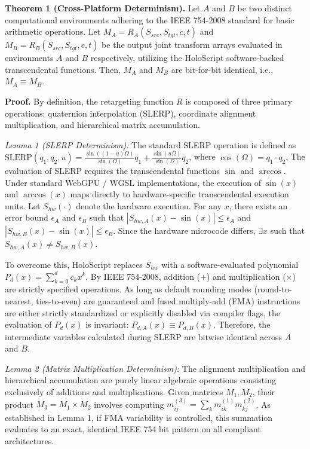 \documentclass[sigconf,nonacm]{acmart}
\begin{document}
\textbf{Theorem 1 (Cross-Platform Determinism).} Let $A$ and $B$ be two distinct
computational environments adhering to the IEEE 754-2008 standard for basic
arithmetic operations. Let $M_A = R_A(S_{src}, S_{tgt}, c, t)$ and $M_B =
R_B(S_{src}, S_{tgt}, c, t)$ be the output joint transform arrays evaluated in
environments $A$ and $B$ respectively, utilizing the HoloScript software-backed
transcendental functions. Then, $M_A$ and $M_B$ are bit-for-bit identical, i.e.,
$M_A \equiv M_B$.

\textbf{Proof.} By definition, the retargeting function $R$ is composed of three
primary operations: quaternion interpolation (SLERP), coordinate alignment
multiplication, and hierarchical matrix accumulation.

\textit{Lemma 1 (SLERP Determinism):} The standard SLERP operation is defined as
$\text{SLERP}(q_1, q_2, u) = \frac{\sin((1-u)\Omega)}{\sin(\Omega)}q_1 +
\frac{\sin(u\Omega)}{\sin(\Omega)}q_2$, where $\cos(\Omega) = q_1 \cdot q_2$.
The evaluation of SLERP requires the transcendental functions $\sin$ and
$\arccos$. Under standard WebGPU / WGSL implementations, the execution of
$\sin(x)$ and $\arccos(x)$ maps directly to hardware-specific transcendental
execution units. Let $S_{hw}(\cdot)$ denote the hardware execution. For any $x$,
there exists an error bound $\epsilon_A$ and $\epsilon_B$ such that
$|S_{hw,A}(x) - \sin(x)| \le \epsilon_A$ and $|S_{hw,B}(x) - \sin(x)| \le
\epsilon_B$. Since the hardware microcode differs, $\exists x$ such that
$S_{hw,A}(x) \neq S_{hw,B}(x)$.

To overcome this, HoloScript replaces $S_{hw}$ with a software-evaluated
polynomial $P_d(x) = \sum_{k=0}^{d} c_k x^k$. By IEEE 754-2008, addition ($+$)
and multiplication ($\times$) are strictly specified operations. As long as
default rounding modes (round-to-nearest, ties-to-even) are guaranteed and fused
multiply-add (FMA) instructions are either strictly standardized or explicitly
disabled via compiler flags, the evaluation of $P_d(x)$ is invariant:
$P_{d,A}(x) \equiv P_{d,B}(x)$. Therefore, the intermediate variables calculated
during SLERP are bitwise identical across $A$ and $B$.

\textit{Lemma 2 (Matrix Multiplication Determinism):} The alignment
multiplication and hierarchical accumulation are purely linear algebraic
operations consisting exclusively of additions and multiplications. Given
matrices $M_1, M_2$, their product $M_3 = M_1 \times M_2$ involves computing
$m^{(3)}_{ij} = \sum_k m^{(1)}_{ik} m^{(2)}_{kj}$. As established in Lemma 1, if
FMA variability is controlled, this summation evaluates to an exact, identical
IEEE 754 bit pattern on all compliant architectures.
\end{document}
